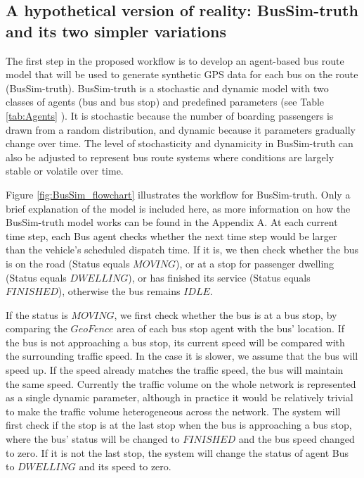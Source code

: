 \subsection{A hypothetical version of reality: BusSim-truth and its two simpler variations}


The first step in the proposed workflow is to develop an agent-based bus route model that will be used to generate synthetic GPS data for each bus on the route (BusSim-truth). BusSim-truth is a stochastic and dynamic model with two classes of agents (bus and bus stop) and predefined parameters (see Table \ref{tab:Agents} ). It is stochastic because the number of boarding passengers is drawn from a random distribution, and dynamic because it parameters gradually change over time. The level of stochasticity and dynamicity in BusSim-truth can also be adjusted to represent bus route systems where conditions are largely stable or volatile over time.  

Figure \ref{fig:BusSim_flowchart} illustrates the workflow for BusSim-truth. Only a brief explanation of the model is included here, as more information on how the BusSim-truth model works can be found in the Appendix A. 
At each current time step, each Bus agent checks whether the next time step would be larger than the vehicle's scheduled dispatch time. If it is, we then check whether the bus is on the road (Status equals $MOVING$), or at a stop for passenger dwelling (Status equals $DWELLING$), or has finished its service (Status equals $FINISHED$), otherwise the bus remains $IDLE$.  

If the status is $MOVING$, we first check whether the bus is at a bus stop, by comparing the $GeoFence$ area of each bus stop agent with the bus' location. If the bus is not approaching a bus stop, its current speed will be compared with the surrounding traffic speed. In the case it is slower, we assume that the bus will speed up. If the speed already matches the traffic speed, the bus will maintain the same speed. Currently the traffic volume on the whole network is represented as a single dynamic parameter, although in practice it would be relatively trivial to make the traffic volume heterogeneous across the network. The system will first check if the stop is at the last stop when the bus is approaching a bus stop, where the bus' status will be changed to $FINISHED$ and the bus speed changed to zero. If it is not the last stop, the system will change the status of agent Bus to $DWELLING$ and its speed to zero. 

